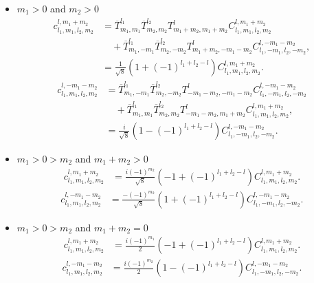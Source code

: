 \documentclass[onecolumn,11pt]{IEEEtran}
\begin{document}
\begin{itemize}
    \item $m_1 > 0$ and $m_2 > 0$
        \begin{align*}
            c^{l,m_1+m_2}_{l_1,m_1,l_2,m_2} & =  \overline T^{l_1}_{m_1,m_1} \overline T^{l_2}_{m_2,m_2} T^l_{m_1+m_2,m_1+m_2} C^{l,m_1+m_2}_{l_1,m_1,l_2,m_2}\\
                                            & \quad + \overline T^{l_1}_{m_1,-m_1} \overline T^{l_2}_{m_2,-m_2} T^l_{m_1+m_2,-m_1-m_2} C^{l,-m_1-m_2}_{l_1,-m_1,l_2,-m_2} ,\\
                                            & = \frac{1}{\sqrt{8}} ( 1 + (-1)^{l_1+l_2-l}) C^{l,m_1+m_2}_{l_1,m_1,l_2,m_2}.
        \end{align*}
        \begin{align*}
            c^{l,-m_1-m_2}_{l_1,m_1,l_2,m_2} & = \overline T^{l_1}_{m_1,-m_1} \overline T^{l_2}_{m_2,-m_2} T^l_{-m_1-m_2,-m_1-m_2} C^{l,-m_1-m_2}_{l_1,-m_1,l_2,-m_2} \nonumber\\
                                             &\quad + \overline T^{l_1}_{m_1,m_1} \overline T^{l_2}_{m_2,m_2} T^l_{-m_1-m_2,m_1+m_2} C^{l,m_1+m_2}_{l_1,m_1,l_2,m_2} ,\\ 
                                            & = \frac{i}{\sqrt{8}} ( 1 - (-1)^{l_1+l_2-l}) C^{l,-m_1-m_2}_{l_1,-m_1,l_2,-m_2}.
        \end{align*}

    \item $m_1 > 0 > m_2 $ and $m_1+m_2 > 0$
        \begin{align*}
            c^{l,m_1+m_2}_{l_1,m_1,l_2,m_2} & = \frac{i(-1)^{m_2}}{\sqrt{8}} ( -1 + (-1)^{l_1+l_2-l}) C^{l,m_1+m_2}_{l_1,m_1,l_2,m_2}.
        \end{align*}
        \begin{align*}
            c^{l,-m_1-m_2}_{l_1,m_1,l_2,m_2} & = \frac{-(-1)^{m_2}}{\sqrt{8}} ( 1 + (-1)^{l_1+l_2-l}) C^{l,-m_1-m_2}_{l_1,-m_1,l_2,-m_2}.
        \end{align*}

    \item $m_1 > 0 > m_2 $ and $m_1+m_2 = 0$
        \begin{align*}
            c^{l,m_1+m_2}_{l_1,m_1,l_2,m_2} & = \frac{i(-1)^{m_1}}{2} ( -1 + (-1)^{l_1+l_2-l}) C^{l,m_1+m_2}_{l_1,m_1,l_2,m_2}.
        \end{align*}
        \begin{align*}
            c^{l,-m_1-m_2}_{l_1,m_1,l_2,m_2} & = \frac{i(-1)^{m_2}}{2} ( 1 - (-1)^{l_1+l_2-l}) C^{l,-m_1-m_2}_{l_1,-m_1,l_2,-m_2}.
        \end{align*}


\end{itemize}
\end{document}
